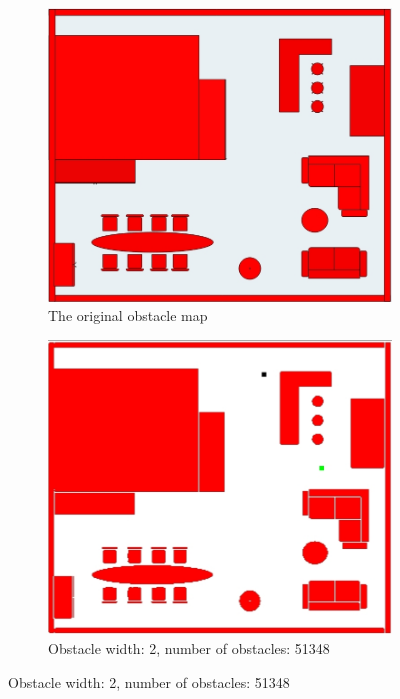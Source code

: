 \begin{enumerate}
\begin{figure}[!h]
	\begin{subfigure}[t]{.5\textwidth}
		\centering
		\includegraphics[width=.95\linewidth]{figures/real_map.jpg}
		\caption{The original obstacle map}
		\label{fig:obsmap_sfig1}
	\end{subfigure}%
	\begin{subfigure}[t]{.5\textwidth}
		\centering
		\includegraphics[width=.95\linewidth]{figures/obs_width_2_total_obs_51348.jpg}
		\caption{Obstacle width: 2, number of obstacles: 51348}
		\label{fig:obsmap_sfig2}
	\end{subfigure}%
\end{figure}


\end{enumerate}
